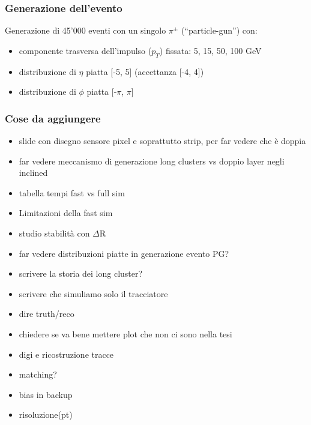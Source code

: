 \documentclass{beamer}
\begin{document}
\begin{frame}
\frametitle{Generazione dell'evento}

Generazione di 45'000 eventi con un singolo $\pi^{\pm}$ (``particle-gun'') con:
{
\begin{itemize}
\item<1-> componente trasversa dell'impulso ($p_{T}$) fissata: 5, 15, 50, 100 GeV
\item<1-> distribuzione di $\eta$ piatta [-5, 5] (accettanza [-4, 4])
\item<1-> distribuzione di $\phi$ piatta [-$\pi$, $\pi$]
\end{itemize}}
\bigskip
{}
\bigskip
{}

\end{frame}



\begin{frame}
\frametitle{Cose da aggiungere}
\begin{itemize}
\item slide con disegno sensore pixel e soprattutto strip, per far vedere che \`e doppia
\item far vedere meccanismo di generazione long clusters vs doppio layer negli inclined
\item tabella tempi fast vs full sim
\item Limitazioni della fast sim
\item studio stabilit\`a con $\Delta$R
\item far vedere distribuzioni piatte in generazione evento PG?
\item scrivere la storia dei long cluster?
\item scrivere che simuliamo solo il tracciatore
\item dire truth/reco
\item chiedere se va bene mettere plot che non ci sono nella tesi
\item digi e ricostruzione tracce
\item matching?
\item bias in backup
\item risoluzione(pt)
\end{itemize}
\end{frame}
\end{document}
